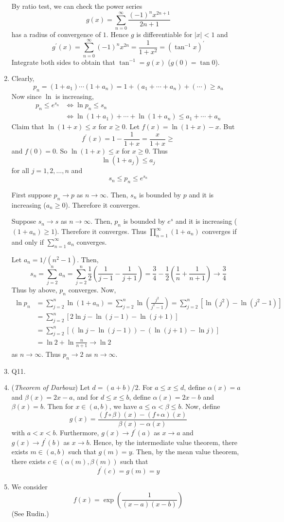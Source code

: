 \documentclass[10pt, a4paper, twoside]{report}
\begin{document}
\begin{enumerate}[{1.}]
By ratio test, we can check the power series 
\[g(x)=\sum_{n=0}^{\infty}\frac{(-1)^nx^{2n+1}}{2n+1}\]
has a radius of convergence of \(1\). Hence \(g\) is differentiable for \(|x|<1\) and 
\[g^\prime(x)=\sum_{n=0}^{\infty}(-1)^nx^{2n}=\frac{1}{1+x^2}=(\tan^{-1}x)^\prime\]
Integrate both sides to obtain that \(\tan^{-1}=g(x)\) (\(g(0)=\tan 0\)).
\item Clearly,
\[p_n=(1+a_1)\cdots(1+a_n)=1+(a_1+\cdots+a_n)+(\cdots)\geq s_n\]
Now since \(\ln\) is increasing,
\begin{align*}
    p_n\leq e^{s_n}&\Leftrightarrow \ln p_n\leq s_n \\
    &\Leftrightarrow \ln(1+a_1)+\cdots+\ln(1+a_n)\leq a_1+\cdots+a_n
\end{align*}
Claim that \(\ln(1+x)\leq x\) for \(x\geq 0\). Let \(f(x)=\ln(1+x)-x\). But  
\[f^\prime(x)=1-\frac{1}{1+x}=\frac x{1+x}\geq\]
and \(f(0)=0\). So  \(\ln(1+x)\leq x\) for \(x\geq 0\). Thus 
\[\ln(1+a_j)\leq a_j\]
for all \(j=1,2,\ldots,n\) and 
\[s_n\leq p_n\leq e^{s_n}\]

First suppose \(p_n\to p\) as \(n\to\infty\). Then, \(s_n\) is bounded by \(p\) and it is increasing (\(a_n\geq 0\)). Therefore it converges. 

Suppose \(s_n\to s\) as \(n\to\infty\). Then, \(p_n\) is bounded by \(e^s\) and it is increasing (\((1+a_n)\geq 1\)). Therefore it converges. Thus \(\prod_{n=1}^\infty(1+a_n)\) converges if and only if \(\sum_{n=1}^{\infty}a_n\) converges.

Let \(a_n=1/(n^2-1)\). Then,
\[s_n=\sum_{j=2}^{n}a_n=\sum_{j=2}^{n}\frac 12\left(\frac 1{j-1}-\frac 1{j+1}\right)=\frac 34-\frac 12\left(\frac 1n+\frac 1{n+1}\right)\to \frac 34\]
Thus by above, \(p_n\) converges. Now,
\begin{align*}
    \ln p_n&=\sum_{j=2}^{n}\ln(1+a_n)=\sum_{j=2}^{n}\ln\left(\frac{j^2}{j^2-1}\right)=\sum_{j=2}^{n}\left[\ln(j^2)-\ln(j^2-1)\right] \\
    &=\sum_{j=2}^{n}\left[2\ln j-\ln(j-1)-\ln(j+1)\right] \\
    &=\sum_{j=2}^{n}\left[(\ln j-\ln(j-1))-(\ln(j+1)-\ln j)\right] \\
    &=\ln 2+\ln\frac n{n+1}\to \ln 2
\end{align*}
as \(n\to\infty\). Thus \(p_n\to 2\) as \(n\to\infty\).
\item Q11.
\item (\emph{Theorem of Darboux}) Let \(d=(a+b)/2\). For \(a\leq x\leq d\), define \(\alpha(x)=a\) and \(\beta(x)=2x-a\), and for \(d\leq x\leq b\), define \(\alpha(x)=2x-b\) and \(\beta(x)=b\). Then for \(x\in(a,b)\), we have \(a\leq\alpha<\beta\leq b\). Now, define 
\[g(x)=\frac{(f\circ\beta)(x)-(f\circ\alpha)(x)}{\beta(x)-\alpha(x)}\]
with \(a<x<b\). Furthermore, \(g(x)\to f^\prime(a)\) as \(x\to a\) and \(g(x)\to f^\prime(b)\) as \(x\to b\). Hence, by the intermediate value theorem, there exists \(m\in(a,b)\) such that \(g(m)=y\). Then, by the mean value theorem, there exists \(c\in(\alpha(m),\beta(m))\) such that 
\[f^\prime(c)=g(m)=y\]
\item We consider 
\[f(x)=\exp\left(\frac{1}{(x-a)(x-b)}\right)\]
(See Rudin.)
\end{enumerate}
\end{document}
